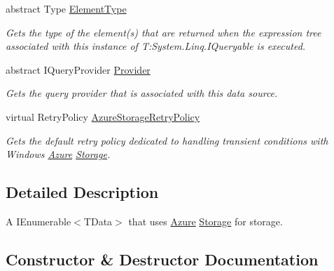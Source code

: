 \begin{DoxyCompactItemize}
abstract Type \hyperlink{classCqrs_1_1Azure_1_1BlobStorage_1_1StorageStore_af298920154f31a7d0117facbb2f7cd54_af298920154f31a7d0117facbb2f7cd54}{Element\+Type}
\begin{DoxyCompactList}\small\item\em Gets the type of the element(s) that are returned when the expression tree associated with this instance of T\+:\+System.\+Linq.\+I\+Queryable is executed. \end{DoxyCompactList}\item 
abstract I\+Query\+Provider \hyperlink{classCqrs_1_1Azure_1_1BlobStorage_1_1StorageStore_a3cc5fd841fb449ca365d05a52e8e8438_a3cc5fd841fb449ca365d05a52e8e8438}{Provider}
\begin{DoxyCompactList}\small\item\em Gets the query provider that is associated with this data source. \end{DoxyCompactList}\item 
virtual Retry\+Policy \hyperlink{classCqrs_1_1Azure_1_1BlobStorage_1_1StorageStore_ad16f8d276c7570c95979b39098d1216b_ad16f8d276c7570c95979b39098d1216b}{Azure\+Storage\+Retry\+Policy}
\begin{DoxyCompactList}\small\item\em Gets the default retry policy dedicated to handling transient conditions with Windows \hyperlink{namespaceCqrs_1_1Azure}{Azure} \hyperlink{namespaceCqrs_1_1Azure_1_1Storage}{Storage}. \end{DoxyCompactList}\end{DoxyCompactItemize}


\subsection{Detailed Description}
A I\+Enumerable$<$\+T\+Data$>$ that uses \hyperlink{namespaceCqrs_1_1Azure}{Azure} \hyperlink{namespaceCqrs_1_1Azure_1_1Storage}{Storage} for storage. 



\subsection{Constructor \& Destructor Documentation}
\mbox{\label{classCqrs_1_1Azure_1_1BlobStorage_1_1StorageStore_ae7a725cdcb7de73e097b02c19463bae7_ae7a725cdcb7de73e097b02c19463bae7}} 
